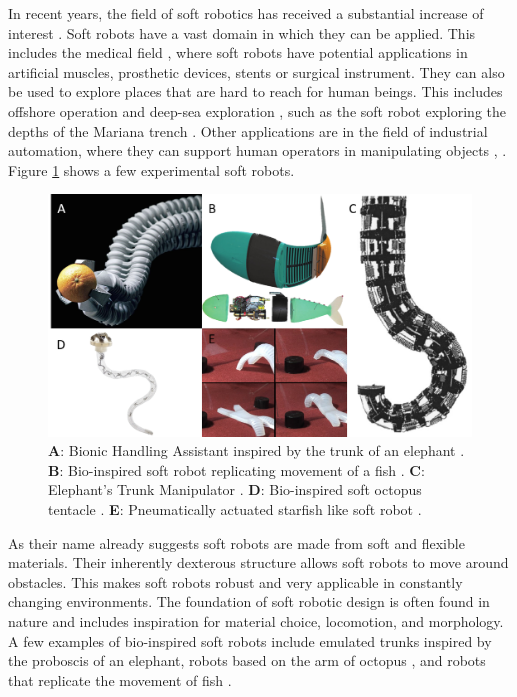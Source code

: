 \label{chapter1}

In recent years, the field of soft robotics has received a substantial increase of interest \cite{iida2011soft}\cite{walker2020soft} \cite{bao2018soft}. Soft robots have a vast domain in which they can be applied. This includes the medical field \cite{sitti2018miniature} \cite{ashuri2020biomedical}, where soft robots have potential applications in artificial muscles, prosthetic devices, stents or surgical instrument. They can also be used to explore places that are hard to reach for human beings. This includes offshore operation and deep-sea exploration \cite{aracri2021soft}, such as the soft robot exploring the depths of the Mariana trench \cite{laschi2021soft}. Other applications are in the field of industrial automation, where they can support human operators in manipulating objects \cite{george2018control}, \cite{grissom2006design}. Figure \ref{fig1:softexample} shows a few experimental soft robots. 



\begin{figure}[H]       
    \centering
    \includegraphics[width = \textwidth]{Figures/Chapter1/robotexamples.png}
    \caption{\textbf{A}: Bionic Handling Assistant inspired by the trunk of an elephant \cite{BHA}. \textbf{B}: Bio-inspired soft robot replicating movement of a fish \cite{marchese2014}. \textbf{C}: Elephant’s Trunk Manipulator \cite{hannan2003kinematics}. \textbf{D}: Bio-inspired soft octopus tentacle \cite{laschi2012soft}. \textbf{E}: Pneumatically actuated starfish like soft robot \cite{shepherd2011multigait}.}
    \label{fig1:softexample}
\end{figure}



As their name already suggests soft robots are made from soft and flexible materials. Their inherently dexterous structure allows soft robots to move around obstacles. This makes soft robots robust and very applicable in constantly changing environments. The foundation of soft robotic design is often found in nature and includes inspiration for material choice, locomotion, and morphology. A few examples of bio-inspired soft robots include emulated trunks \cite{hannan2003kinematics} inspired by the proboscis of an elephant, robots based on the arm of octopus \cite{wang2013visual}, and robots that replicate the movement of fish \cite{marchese2014}. 


